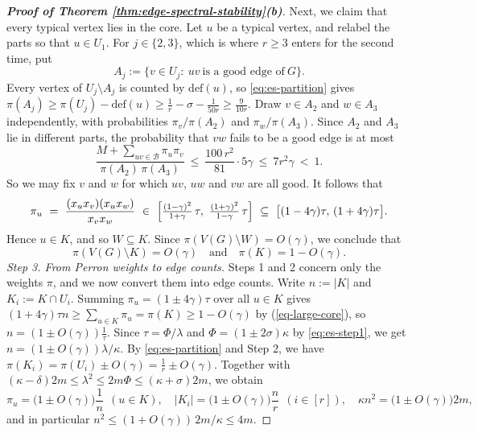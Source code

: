 \documentclass[11pt, a4paper]{article}
\theoremstyle{definition}
\theoremstyle{plain}
\renewcommand{\le}{\leqslant}
\renewcommand{\ge}{\geqslant}
\begin{document}
\begin{proof}[{\bf Proof of Theorem
\ref{thm:edge-spectral-stability}(b)}]
Next, we claim that every typical vertex lies in the core.
Let $u$ be a typical vertex, 
and relabel the parts so that $u\in U_1$.
For $j\in \{2,3\}$, which is where $r\ge 3$ enters for the
second time, put
\[
  A_j:=\{v\in U_j:\ uv\ \text{is a good edge of}\ G\}.
\]
Every vertex of $U_j\setminus A_j$ is counted by
$\mathrm{def}(u)$, so \eqref{eq:es-partition} gives
$\pi (A_j)\ge \pi (U_j)-\mathrm{def}(u)\ge
\frac1r-\sigma -\frac{1}{50r}\ge \frac{9}{10r}$. 
 Draw $v\in A_2$ and $w\in A_3$ independently, with probabilities
${\pi_v}/{\pi (A_2)}$ and ${\pi_w}/{\pi (A_3)}$. 
Since $A_2$ and $A_3$
lie in different parts, the probability that $vw$ fails to be
a good edge is at most
\[
  \frac{M+\sum_{uv\in \mathcal{B}}\pi_u\pi_v}
       {\pi (A_2)\,\pi (A_3)}
  \ \le\ \frac{100\,r^{2}}{81}\cdot 5\gamma
  \ \le\ 7r^{2}\gamma \ <\ 1 .
\]
So we may fix $v$ and $w$ for which $uv$, $uw$ and $vw$ are
all good. It follows that 
\[
  \pi_u\ =\ \frac{(x_ux_v)(x_ux_w)}{x_vx_w}
  \ \in\ \Bigl[\tfrac{(1-\gamma )^{2}}{1+\gamma}\,\tau ,\
  \tfrac{(1+\gamma )^{2}}{1-\gamma}\,\tau \Bigr]
  \ \subseteq\ \bigl[(1-4\gamma )\tau ,\,
  (1+4\gamma )\tau \bigr]. 
\]
Hence $u\in K$, and so $W\subseteq K$. 
Since $\pi (V(G)\setminus W) = O(\gamma)$, we conclude that  
\begin{equation} \label{eq-large-core}
  \pi (V(G)\setminus K) = O(\gamma) 
  \quad \text{and} \quad 
\pi (K)= 1- O(\gamma). 
\end{equation}  
\textit{Step 3. From Perron weights to edge counts.} 
Steps 1 and 2 concern only the weights $\pi$,  
and we now convert them into edge counts. 
Write $n:=|K|$ and $K_i:=K\cap U_i$. Summing
$\pi_u=(1\pm 4\gamma )\tau$ over all $u\in K$ gives 
$(1+ 4\gamma)\tau n \ge \sum_{u\in K} \pi_u  = \pi (K) \ge 1- O(\gamma)$ by (\ref{eq-large-core}), 
so $n =(1\pm O(\gamma )) \frac{1}{\tau}$.
 Since $\tau =\Phi /\lambda$ and $\Phi =(1\pm 2\sigma )\kappa$ by
\eqref{eq:es-step1}, we get 
$n=(1\pm O(\gamma ))\lambda /\kappa$. 
By \eqref{eq:es-partition} and Step 2, we have 
$\pi (K_i)= \pi (U_i) \pm O(\gamma) = \frac1r\pm O(\gamma )$. 
Together with
$(\kappa -\delta )2m\le \lambda^{2}\le 2m\Phi \le
(\kappa +\sigma )2m$, we obtain
\begin{equation}\label{eq:es-core}
  \pi_u= \big(1\pm O(\gamma ) \big) \frac{1}{n}\ \ (u\in K),
  \quad
  |K_i|= \big(1\pm O(\gamma ) \big)\frac{n}{r} \ \ (i\in [r]),
  \quad
  \kappa n^{2}=\big(1\pm O(\gamma ) \big) 2m ,
\end{equation}
and in particular
$n^{2}\le (1+O(\gamma ))\,2m/\kappa \le 4m$.


\end{proof}
\end{document}

